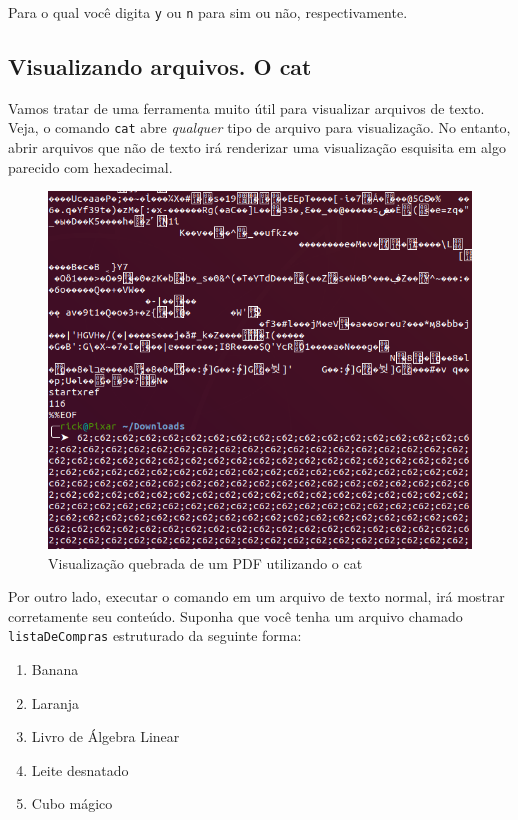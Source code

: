 \documentclass{article}
\begin{document}
	Para o qual você digita \texttt{y} ou \texttt{n} para sim ou não, respectivamente. 

	\subsection{Visualizando arquivos. O cat} 

	Vamos tratar de uma ferramenta muito útil para visualizar arquivos de texto. Veja, o comando \texttt{cat} abre 
	\textit{qualquer} tipo de arquivo para visualização. No entanto, abrir arquivos que não de texto irá renderizar 
	uma visualização esquisita em algo parecido com hexadecimal.

	\begin{figure}[ht!]
  		\centering
		\includegraphics[scale=0.3]{figs/brokenCat.png} 
  		\caption*{Visualização quebrada de um PDF utilizando o cat}
	\end{figure}


	Por outro lado, executar o comando em um arquivo de texto normal, irá mostrar corretamente seu conteúdo. 
	Suponha que você tenha um arquivo chamado \texttt{listaDeCompras} estruturado da seguinte forma:

	\begin{enumerate}
		\item{Banana}
		\item{Laranja} 
		\item{Livro de Álgebra Linear} 
		\item{Leite desnatado} 
		\item{Cubo mágico} 
	\end{enumerate} 
\end{document}
